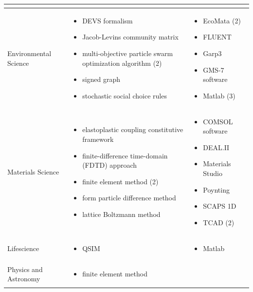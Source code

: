 \documentclass[utf8]{gradu3}
\begin{document}
\begin{longtable}[h]{|p{4cm}|p{6cm}|p{5cm}|}
\begin{itemize}
    \end{itemize}
    \\
    \hline
    Environmental Science & \begin{itemize}
        \item DEVS formalism
        \item Jacob-Levins community matrix
        \item multi-objective particle swarm optimization algorithm (2)
        \item signed graph
        \item stochastic social choice rules
    \end{itemize} &
    \begin{itemize}
        \item EcoMata (2)
        \item FLUENT
        \item Garp3
        \item GMS-7 software
        \item Matlab (3)
    \end{itemize}
    \\
    \hline
    Materials Science & \begin{itemize}
        \item elastoplastic coupling constitutive framework
        \item finite-difference time-domain (FDTD) approach
        \item finite element method (2)
        \item form particle difference method
        \item lattice Boltzmann method
    \end{itemize} &
    \begin{itemize}
        \item COMSOL software
        \item DEAL.II 
        \item Materials Studio
        \item Poynting
        \item SCAPS 1D
        \item TCAD (2)
    \end{itemize}
    \\
    \hline
    Lifescience & \begin{itemize}
        \item QSIM
    \end{itemize} &
    \begin{itemize}
        \item Matlab
    \end{itemize}
    \\
    \hline
    Physics and Astronomy & \begin{itemize}
        \item finite element method
    \end{itemize} &
    

\end{longtable}
\end{document}
